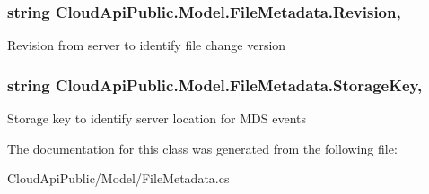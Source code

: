 \hypertarget{class_cloud_api_public_1_1_model_1_1_file_metadata_a92dcb8b7561985fc7e817f154f50b61d}{
\subsubsection[{Revision}]{\setlength{\rightskip}{0pt plus 5cm}string Cloud\-Api\-Public.\-Model.\-File\-Metadata.\-Revision\hspace{0.3cm}{\ttfamily [get]}, {\ttfamily [set]}}}\label{class_cloud_api_public_1_1_model_1_1_file_metadata_a92dcb8b7561985fc7e817f154f50b61d}


Revision from server to identify file change version 

\hypertarget{class_cloud_api_public_1_1_model_1_1_file_metadata_a0290dee37319988ca953fb76c9502cd1}{
\subsubsection[{Storage\-Key}]{\setlength{\rightskip}{0pt plus 5cm}string Cloud\-Api\-Public.\-Model.\-File\-Metadata.\-Storage\-Key\hspace{0.3cm}{\ttfamily [get]}, {\ttfamily [set]}}}\label{class_cloud_api_public_1_1_model_1_1_file_metadata_a0290dee37319988ca953fb76c9502cd1}


Storage key to identify server location for M\-D\-S events 



The documentation for this class was generated from the following file\-:\begin{DoxyCompactItemize}
\item 
Cloud\-Api\-Public/\-Model/File\-Metadata.\-cs\end{DoxyCompactItemize}
